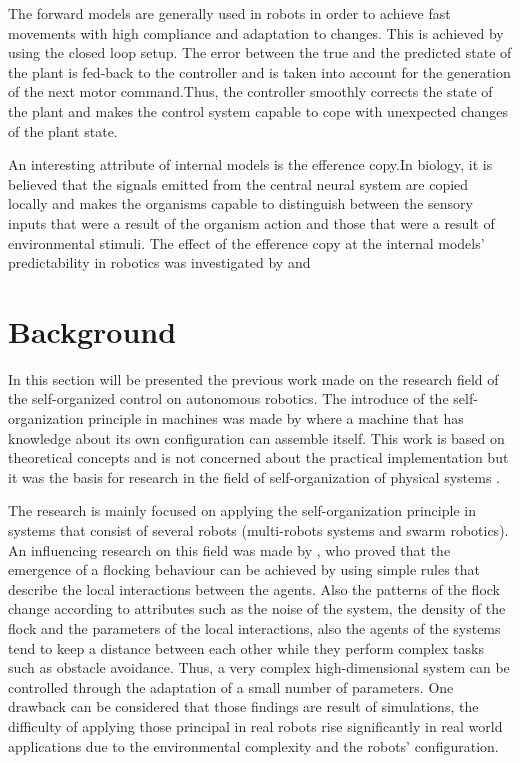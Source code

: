 \documentclass[msc,ai,logo]{infthesis}
\begin{document}
The forward models are generally used in robots in order to achieve fast movements with high compliance and adaptation to changes. This is achieved by using the closed loop setup. The error between the true and the predicted state of the plant is fed-back to the controller and is taken into account for the generation of the next motor command.Thus, the controller smoothly corrects the state of the plant and makes the control system capable to cope with unexpected changes of the plant state.

An interesting attribute of internal models is the efference copy.In biology, it is believed that the signals emitted from the central neural system are copied locally and makes the organisms capable to distinguish between the sensory inputs that were a result of the organism action and those that were a result of environmental stimuli. The effect of the efference copy at the internal models' predictability in robotics was investigated by \cite{Schroder} and \cite{Manoonpong}    

\section{Background}
In this section will be presented the previous work made on the research field of the self-organized control on autonomous robotics. The introduce of the self-organization principle in machines was made by \cite{Neumann} where a machine that has knowledge about its own configuration can assemble itself. This work is based on theoretical concepts and is not concerned about the practical implementation but it was the basis for research in the field of self-organization of physical systems \citep[p~.38]{murata2012self}. 

The research is mainly focused on applying the self-organization principle in systems that consist of several robots (multi-robots systems and swarm robotics). An influencing research on this field was made by \cite{Reynolds}, who proved that the emergence of a flocking behaviour can be achieved by using simple rules that describe the local interactions between the agents. Also the patterns of the flock change according to attributes such as the noise  of the system, the density of the flock and the parameters of the local interactions, also the agents of the systems tend to keep a distance between each other while they perform complex tasks such as obstacle avoidance. Thus, a very complex high-dimensional system can be controlled through the adaptation of a small number of parameters. One drawback can be considered that those findings are result of simulations, the difficulty of applying those principal in real robots rise significantly in real world applications due to the environmental complexity and the robots' configuration.
\end{document}
